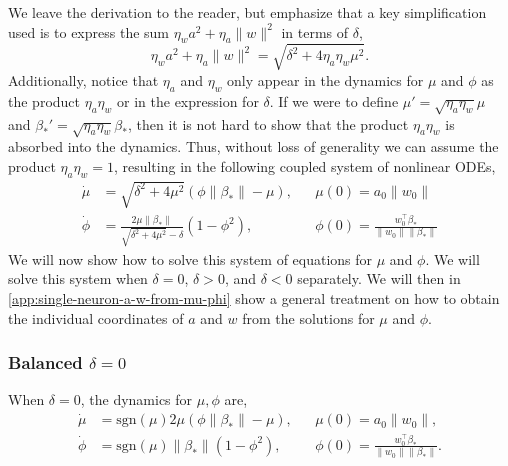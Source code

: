 \documentclass{article}
\theoremstyle{plain}
\theoremstyle{definition}
\theoremstyle{remark}
\begin{document}
We leave the derivation to the reader, but emphasize that a key simplification used is to express the sum $\eta_w a^2 + \eta_a\|w\|^2$ in terms of $\delta$,
\begin{equation}
    \label{eq:single-neuron-key-simplification}
    \eta_w a^2 + \eta_a\|w\|^2 = \sqrt{\delta^2 + 4\eta_a\eta_w\mu^2}.
\end{equation}
%
Additionally, notice that $\eta_a$ and $\eta_w$ only appear in the dynamics for $\mu$ and $\phi$ as the product $\eta_a\eta_w$ or in the expression for $\delta$.
%
If we were to define $\mu' = \sqrt{\eta_a\eta_w}\mu$ and $\beta_*' = \sqrt{\eta_a\eta_w} \beta_*$, then it is not hard to show that the product $\eta_a\eta_w$ is absorbed into the dynamics.
%
Thus, without loss of generality we can assume the product $\eta_a\eta_w = 1$, resulting in the following coupled system of nonlinear ODEs,
\begin{align}
    \dot{\mu} &= \sqrt{\delta^2 + 4\mu^2}\left(\phi\|\beta_*\| - \mu\right), &&\mu(0)=a_0\|w_0\|\\
    \dot{\phi} &= \frac{2\mu\|\beta_*\|}{\sqrt{\delta^2 + 4\mu^2} - \delta} \left(1 - \phi^2\right), &&\phi(0)=\frac{w_0^\intercal \beta_*}{\|w_0\|\|\beta_*\|}
\end{align}
%
We will now show how to solve this system of equations for $\mu$ and $\phi$.
%
We will solve this system when $\delta = 0$, $\delta > 0$, and $\delta < 0$ separately.
%
We will then in \cref{app:single-neuron-a-w-from-mu-phi} show a general treatment on how to obtain the individual coordinates of $a$ and $w$ from the solutions for $\mu$ and $\phi$.


\subsubsection{\texorpdfstring{Balanced $\delta = 0$}{}}
\label{app:single-neuron-balanced}

When $\delta = 0$, the dynamics for $\mu, \phi$ are,
\begin{align}
    \dot{\mu} &= \mathrm{sgn}(\mu) 2 \mu(\phi\|\beta_*\| - \mu), &&\mu(0)=a_0\|w_0\|,\\  \dot{\phi} &= \mathrm{sgn}(\mu) \|\beta_*\|(1 - \phi^2), &&\phi(0)=\tfrac{w_0^\intercal \beta_*}{\|w_0\|\|\beta_*\|}.
\end{align}
\end{document}
